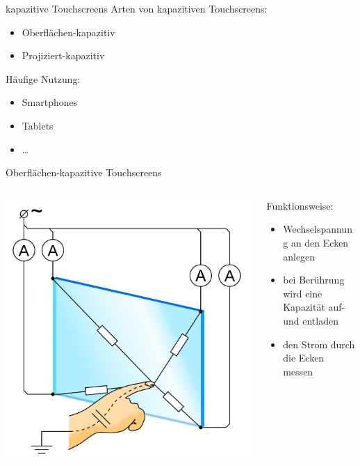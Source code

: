 \documentclass[12pt]{beamer}
\begin{document}
	\begin{frame}{kapazitive Touchscreens}
		Arten von kapazitiven Touchscreens:
		\begin{itemize}
			\item Oberflächen-kapazitiv
			\item Projiziert-kapazitiv
		\end{itemize}
		\medskip
		Häufige Nutzung:
		\begin{itemize}
			\item Smartphones
			\item Tablets
			\item \dots
		\end{itemize}
	\end{frame}

	\begin{frame}{Oberflächen-kapazitive Touchscreens}
		\begin{columns}
			\begin{column}{0.4\textwidth}
				\includegraphics[width=\textwidth]{../Images/SurfaceCapacitiveTouchScreen.png}
				
			\end{column}
			\begin{column}{0.6\textwidth}
				Funktionsweise:
				\begin{itemize}
					\item<+-> Wechselspannung an den Ecken anlegen
					\item<+-> bei Berührung wird eine Kapazität auf- und entladen
					\item<+-> den Strom durch die Ecken messen
				\end{itemize}
			\end{column}
		\end{columns}
	\end{frame}
	
\end{document}
